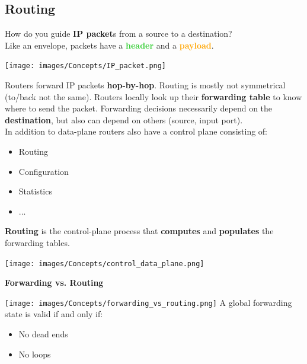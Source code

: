 \documentclass[a4paper, fontsize=8pt, landscape, DIV=1]{scrartcl}
\begin{document}
\begin{multicols*}{4}
		\subsection{Routing}
		How do you guide \textbf{IP packet}s from a source to a destination? \\
		Like an envelope, packets have a \textcolor{LimeGreen}{\textbf{header}} and a
		\textcolor{Orange}{\textbf{payload}}.\\ 
		\begin{center}
			\texttt{[image: images/Concepts/IP\_packet.png]}
		\end{center}
		Routers forward IP packets \textbf{hop-by-hop}. Routing is mostly not
		symmetrical (to/back not the same). Routers locally look up their
		\textbf{forwarding table} to know where to send the packet. Forwarding decisions
		necessarily depend on the \textbf{destination}, but also can depend on others
		(source, input port).\\
		In addition to data-plane routers also have a control plane consisting of:
		\vspace{-0.2cm}
		\begin{itemize}[noitemsep]
			\item Routing
			\item Configuration
			\item Statistics
			\item ... 
		\end{itemize}  
		\textbf{Routing} is the control-plane process that \textbf{computes} and
		\textbf{populates} the forwarding tables.
		\begin{center}
			
			\texttt{[image: images/Concepts/control\_data\_plane.png]}
		\end{center}
		\textbf{Forwarding vs. Routing}\\
		\vspace{0.1cm}	
		
		\texttt{[image: images/Concepts/forwarding\_vs\_routing.png]}
		A global forwarding state is valid if and only if:
		\begin{itemize}[noitemsep]
			\item No dead ends
			\item No loops
		\end{itemize} 
		

\end{multicols*}
\end{document}
